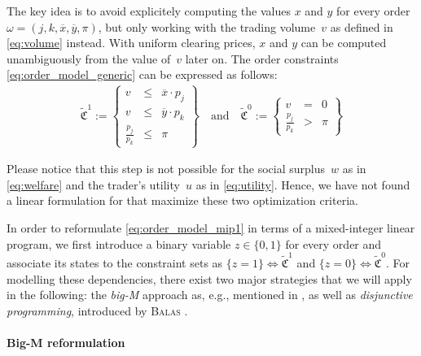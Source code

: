 \documentclass[11pt,parskip=full]{scrartcl}%
\newcommand*{\eg}{e.g., }
\begin{document}
The key idea is to avoid explicitely computing the values $x$ and $y$ for every order~$\omega = (j,k,\overline{x},\overline{y},\pi)$, but only working with the trading volume~$v$ as defined in \eqref{eq:volume} instead.
With uniform clearing prices, $x$ and $y$ can be computed unambiguously from the value of~$v$ later on.
The order constraints \eqref{eq:order_model_generic} can be expressed as follows:
\begin{align}
  \tilde{\mathfrak{C}}^1 := \left\{
  \begin{array}{rlll}
    v &\le & \overline{x} \cdot p_j \\
    v &\le & \overline{y} \cdot p_k \\[1mm]
    \frac{p_j}{p_k} &\le & \pi
  \end{array}
  \right\}
  \quad
  \text{and}
  \quad
  \tilde{\mathfrak{C}}^0 := \left\{
  \begin{array}{rll}
    v &= & 0 \\[1mm]
    \frac{p_j}{p_k} &> & \pi
  \end{array}
  \right\}
  \label{eq:order_model_mip1}
\end{align}

Please notice that this step is not possible for the social surplus~$w$ as in \eqref{eq:welfare} and the trader's utility~$u$ as in \eqref{eq:utility}. 
Hence, we have not found a linear formulation for that maximize these two optimization criteria.

In order to reformulate \eqref{eq:order_model_mip1} in terms of a mixed-integer linear program,
we first introduce a binary variable $ z \in \{0,1\} $ for every order and associate its states to
the constraint sets as $ \{z = 1\} \Leftrightarrow \tilde{\mathfrak{C}}^1 $ and
$ \{z = 0\} \Leftrightarrow \tilde{\mathfrak{C}}^0 $.
For modelling these dependencies, there exist two major strategies that we will apply in the
following:
the \emph{big-M} approach as, \eg mentioned in \cite{BONAMI-ET-AL_2015:indicator-constraints},
as well as \emph{disjunctive programming}, introduced by \textsc{Balas} \cite{BALAS_1979:DP}.

\paragraph{Big-M reformulation}
\end{document}
